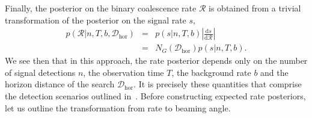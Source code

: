 \documentclass[twocolumn,nofootinbib]{revtex4-1}
\newcommand{\cbcrate}{{{\mathcal R}}}
\newcommand{\diff}{{\mathrm d}}
\newcommand{\dhor}{{\mathcal D}_{\mathrm{hor}}}
\begin{document}
Finally, the posterior on the binary coalescence rate $\cbcrate$ is obtained from
a trivial transformation of the posterior on the signal rate $s$,
%
\begin{eqnarray}
    p(\cbcrate|n,T,b,\dhor) & = & p(s|n,T,b) \left|\frac{\diff s}{\diff \cbcrate}\right| \\
                                   & = & N_G(\dhor)p(s|n,T,b).
\end{eqnarray}
%
We see then that in this approach, the rate posterior depends only on the number
of signal detections $n$, the observation time $T$, the background rate $b$ and
the horizon distance of the search $\dhor$.  It is precisely these quantities
that comprise the detection scenarios outlined in~\cite{ade_prospects}.  Before
constructing expected rate posteriors, let us outline the transformation from
rate to beaming angle.
\end{document}
